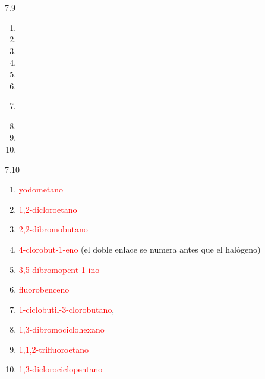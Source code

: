 \begin{Solution}{7.9}
        \begin{enumerate}[label=\alph*)]
            \item {}
            \item {}
            \item {}
            \item {}
            \item {}
            \item {}
            \item {}\\
            \item {}
            \item {}
            \item {}
        \end{enumerate}
    
\end{Solution}
\begin{Solution}{7.10}
        \begin{enumerate}[label=\alph*)]
            \item \textcolor{red}{yodometano}
            \item \textcolor{red}{1,2-dicloroetano}
            \item \textcolor{red}{2,2-dibromobutano}
            \item \textcolor{red}{4-clorobut-1-eno} (el doble enlace se numera antes que el halógeno)
            \item \textcolor{red}{3,5-dibromopent-1-ino}
            \item \textcolor{red}{fluorobenceno}
            \item \textcolor{red}{1-ciclobutil-3-clorobutano}, 
            \item \textcolor{red}{1,3-dibromociclohexano}
            \item \textcolor{red}{1,1,2-trifluoroetano}
            \item \textcolor{red}{1,3-diclorociclopentano}
        \end{enumerate}
    
\end{Solution}

